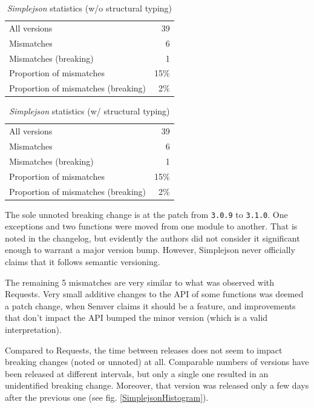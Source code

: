 \documentclass{l4proj}
\newcommand\genericstyle{\lstset{basicstyle=\ttm}}
\newcommand\codeinline[1]{{\genericstyle\lstinline!#1!}}
\begin{document}
\noindent
\begin{minipage}[t]{0.5\textwidth}
\begin{table}[H]
\centering
\begin{tabular}{|lr|}
All versions & 39 \\
Mismatches & 6 \\
Mismatches (breaking) & 1 \\
Proportion of mismatches & 15\% \\
Proportion of mismatches (breaking) & 2\%
\end{tabular}
\caption{\textit{Simplejson} statistics (w/o structural typing)}
\label{SimplejsonNonStructural}
\end{table}
\end{minipage}
\begin{minipage}[t]{0.5\textwidth}
\begin{table}[H]
\centering
\begin{tabular}{|lr|}
All versions & 39 \\
Mismatches & 6 \\
Mismatches (breaking) & 1 \\
Proportion of mismatches & 15\% \\
Proportion of mismatches (breaking) & 2\%
\end{tabular}
\caption{\textit{Simplejson} statistics (w/ structural typing)}
\label{SimplejsonStructural}
\end{table}
\end{minipage}

The sole unnoted breaking change is at the patch from
\codeinline{3.0.9} to \codeinline{3.1.0}. One exceptions and two
functions were moved from one module to another. That is noted in the
changelog, but evidently the authors did not consider it significant
enough to warrant a major version bump. However, Simplejson
never officially claims that it follows semantic versioning.

The remaining 5 mismatches are very similar to what was observed with
Requests. Very small additive changes to the API of some functions was
deemed a patch change, when Semver claims it should be a feature, and
improvements that don't impact the API bumped the minor version (which
is a valid interpretation).

Compared to Requests, the time between releases does not seem
to impact breaking changes (noted or unnoted) at all. Comparable
numbers of versions have been released at different intervals, but
only a single one resulted in an unidentified breaking change.
Moreover, that version was released only a few days after the previous
one (see fig. \ref{SimplejsonHistogram}).
\end{document}
